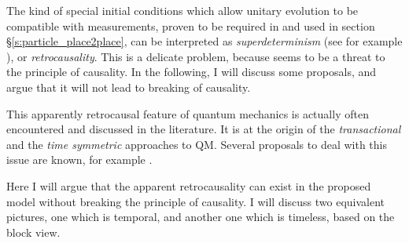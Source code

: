 \documentclass[12pt]{amsart}
\theoremstyle{definition}
\theoremstyle{plain}
\begin{document}
The kind of special initial conditions which allow unitary evolution to be compatible with measurements, proven to be required in \cite{Sto12QMb} and used in section \S\ref{s:particle_place2place}, can be interpreted as \emph{superdeterminism} (see for example \cite{hooft2011wave}), or \emph{retrocausality}. This is a delicate problem, because seems to be a threat to the principle of causality. In the following, I will discuss some proposals, and argue that it will not lead to breaking of causality.

This apparently retrocausal feature of quantum mechanics is actually often encountered and discussed in the literature. It is at the origin of the \emph{transactional} \cite{cramer1986transactional,cramer1988overview} and the \emph{time symmetric} \cite{aharonov1964time,aharonov1988result,aharonov1991complete,aharonov2007newinsights,aharonov2007TSV} approaches to QM. Several proposals to deal with this issue are known, for example \cite{deBeauregard1953-DEBMQ,Rietdijk1978retroactiveInfluence,price2008toyRetrocausality,price2015disentangling}.

Here I will argue that the apparent retrocausality can exist in the proposed model without breaking the principle of causality. I will discuss two equivalent pictures, one which is temporal, and another one which is timeless, based on the block view.
\end{document}
